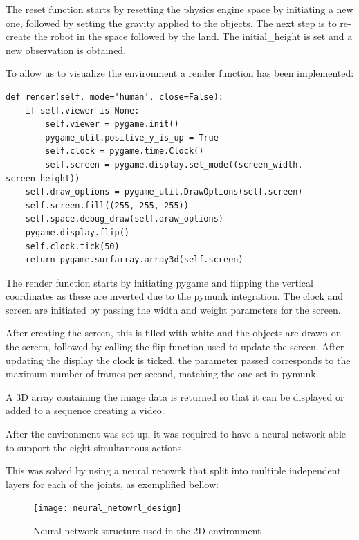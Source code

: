 The reset function starts by resetting the physics engine space by initiating a new one, followed by setting the gravity applied to the objects. The next step is to re-create the robot in the space followed by the land.
The initial\_height is set and a new observation is obtained.

To allow us to visualize the environment a render function has been implemented:

\begin{lstlisting}
def render(self, mode='human', close=False):
    if self.viewer is None:
        self.viewer = pygame.init()
        pygame_util.positive_y_is_up = True
        self.clock = pygame.time.Clock()
        self.screen = pygame.display.set_mode((screen_width, screen_height))
    self.draw_options = pygame_util.DrawOptions(self.screen)
    self.screen.fill((255, 255, 255))
    self.space.debug_draw(self.draw_options)
    pygame.display.flip()
    self.clock.tick(50)
    return pygame.surfarray.array3d(self.screen)
\end{lstlisting}

The render function starts by initiating pygame and flipping the vertical coordinates as these are inverted due to the pymunk integration. The clock and screen are initiated by passing the width and weight parameters for the screen.

After creating the screen, this is filled with white and the objects are drawn on the screen, followed by calling the flip function used to update the screen.
After updating the display the clock is ticked, the parameter passed corresponds to the maximum number of frames per second, matching the one set in pymunk.

A 3D array containing the image data is returned so that it can be displayed or added to a sequence creating a video. 

After the environment was set up, it was required to have a neural network able to support the eight simultaneous actions.

This was solved by using a neural netowrk that split into multiple independent layers for each of the joints, as exemplified bellow:

\begin{figure}[H]
    \centering
    \texttt{[image: neural\_netowrl\_design]}
    \caption{Neural network structure used in the 2D environment}
\end{figure}

